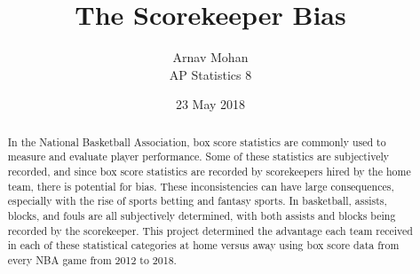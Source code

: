 \documentclass{article}
\title{The Scorekeeper Bias}
\author{Arnav Mohan\\ AP Statistics 8}
\date{23 May 2018}
\begin{document}
\maketitle
\begin{abstract}
    In the National Basketball Association, box score statistics are commonly used to measure and evaluate player performance. Some of these statistics are subjectively recorded, and since box score statistics are recorded by scorekeepers hired by the home team, there is potential for bias. These inconsistencies can have large consequences, especially with the rise of sports betting and fantasy sports. In basketball, assists, blocks, and fouls are all subjectively determined, with both assists and blocks being recorded by the scorekeeper. This project determined the advantage each team received in each of these statistical categories at home versus away using box score data from every NBA game from 2012 to 2018.
\end{abstract}
\newpage
\tableofcontents
\newpage
\end{document}
